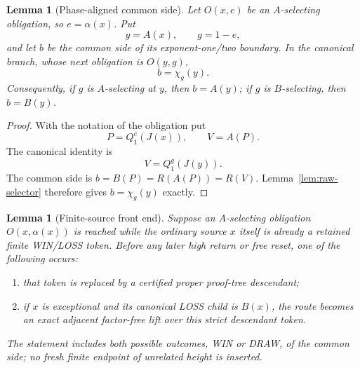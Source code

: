 \documentclass[11pt]{article}
\newtheorem{lemma}[theorem]{Lemma}
\begin{document}
\begin{lemma}[Phase-aligned common side]\label{lem:phase-aligned-side}
Let $O(x,e)$ be an $A$-selecting obligation, so $e=\alpha(x)$.  Put
\[
 y=A(x),\qquad g=1-e,
\]
and let $b$ be the common side of its exponent-one/two boundary.  In the
canonical branch, whose next obligation is $O(y,g)$,
\[
 \boxed{b=\chi_g(y).}
\]
Consequently, if $g$ is $A$-selecting at $y$, then $b=A(y)$; if $g$ is
$B$-selecting, then $b=B(y)$.
\end{lemma}

\begin{proof}
With the notation of the obligation put
\[
 P=Q_1^e(J(x)),\qquad V=A(P).
\]
The canonical identity is
\[
 V=Q_1^g(J(y)).
\]
The common side is $b=B(P)=R(A(P))=R(V)$.  Lemma~\ref{lem:raw-selector}
therefore gives $b=\chi_g(y)$ exactly.
\end{proof}

\begin{lemma}[Finite-source front end]\label{lem:finite-front}
Suppose an $A$-selecting obligation $O(x,\alpha(x))$ is reached while the
ordinary source $x$ itself is already a retained finite WIN/LOSS token.
Before any later high return or free reset, one of the following occurs:
\begin{enumerate}[label=(\alph*)]
\item that token is replaced by a certified proper proof-tree descendant;
\item if $x$ is exceptional and its canonical LOSS child is $B(x)$, the
      route becomes an exact adjacent factor-free lift over this strict
      descendant token.
\end{enumerate}
The statement includes both possible outcomes, WIN or DRAW, of the common
side; no fresh finite endpoint of unrelated height is inserted.
\end{lemma}
\end{document}
